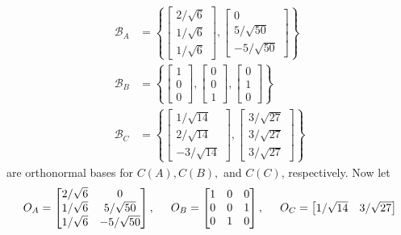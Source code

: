 \documentclass[11pt]{article}
\begin{document}
\begin{itemize}
\begin{align*}
\mathcal{B}_A &= \left\{\begin{bmatrix}
2/\sqrt{6} \\ 1/\sqrt{6} \\ 1/\sqrt{6}\end{bmatrix}, \begin{bmatrix}
0 \\ 5/\sqrt{50} \\ -5/\sqrt{50}
\end{bmatrix}
\right\} \\
\mathcal{B}_B &= \left\{ \begin{bmatrix}
1 \\ 0 \\ 0
\end{bmatrix},\begin{bmatrix}
0 \\ 0 \\ 1
\end{bmatrix}, \begin{bmatrix}
0 \\ 1 \\ 0
\end{bmatrix} \right\} \\
\mathcal{B}_C &= \left\{\begin{bmatrix}
1/\sqrt{14} \\ 2/\sqrt{14} \\ -3/\sqrt{14}
\end{bmatrix}, \begin{bmatrix}
3/\sqrt{27} \\ 3/\sqrt{27} \\ 3/\sqrt{27}
\end{bmatrix} \right\}
\end{align*}
are orthonormal bases for $C(A), C(B),$ and $C(C)$, respectively.  Now let 
\[
O_A = \begin{bmatrix}
2/\sqrt{6} & 0 \\
1/\sqrt{6} & 5/\sqrt{50} \\
1/\sqrt{6} & -5/\sqrt{50}
\end{bmatrix}, \hspace{5mm} O_B = \begin{bmatrix}
1 & 0 & 0 \\
0 & 0 & 1 \\
0 & 1 & 0
\end{bmatrix}, \hspace{5mm} O_C = \begin{bmatrix}
1/\sqrt{14} & 3/\sqrt{27} \\

\end{bmatrix}\]
\end{itemize}
\end{document}
